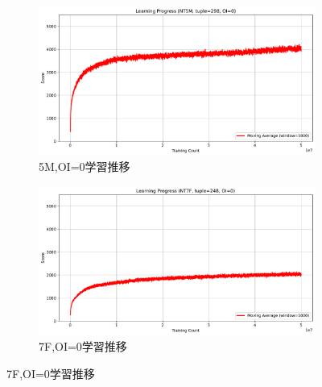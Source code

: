 \begin{figure}[t]
    \centering
    \begin{subfigure}[b]{0.49\linewidth}
        \includegraphics[width=\linewidth]{pdf/learning_progress_plots/learning_progress_NT5_tuple298_OI0.pdf}
        \caption{5M,OI=0学習推移}
        \label{fig:NT5F_OI0_learning_progress}
    \end{subfigure}
    \begin{subfigure}[b]{0.49\linewidth}
        \includegraphics[width=\linewidth]{pdf/learning_progress_plots/learning_progress_NT7_tuple248_OI0.pdf}
        \caption{7F,OI=0学習推移}
        \label{fig:NT7F_OI0_learning_progress}
    \end{subfigure}


\end{figure}
